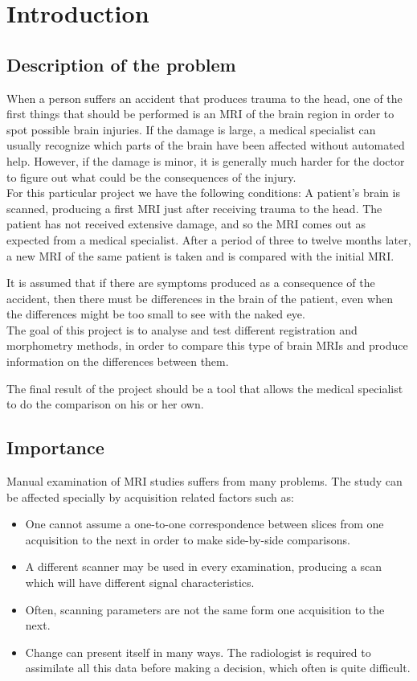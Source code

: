 \chapter{Introduction}

\section{Description of the problem}
When a person suffers an accident that produces trauma to the head, one of the first things that should be performed is an MRI of the brain region in order to spot possible brain injuries. If the damage is large, a medical specialist can usually recognize which parts of the brain have been affected without automated help. However, if the damage is minor, it is generally much harder for the doctor to figure out what could be the consequences of the injury. \\

For this particular project we have the following conditions: A patient's brain is scanned, producing a first MRI just after receiving trauma to the head. The patient has not received extensive damage, and so the MRI comes out as expected from a medical specialist. After a period of three to twelve months later, a new MRI of the same patient is taken and is compared with the initial MRI.

It is assumed that if there are symptoms produced as a consequence of the accident, then there must be differences in the brain of the patient, even when the differences might be too small to see with the naked eye.\\


The goal of this project is to analyse and test different registration and morphometry methods, in order to compare this type of brain MRIs and produce information on the differences between them. 

The final result of the project should be a tool that allows the medical specialist to do the comparison on his or her own.


\section{Importance}

Manual examination of MRI studies suffers from many problems. The study can be affected specially by acquisition related factors such as:
\begin{itemize}
\item One cannot assume a one-to-one correspondence between slices from one acquisition to the next in order to make side-by-side comparisons.
\item A different scanner may be used in every examination, producing a scan which will have different signal characteristics.
\item Often, scanning parameters are not the same form one acquisition to the next.
\item Change can present itself in many ways. The radiologist is required to assimilate all this data before making a decision, which often is quite difficult.
\end{itemize}

